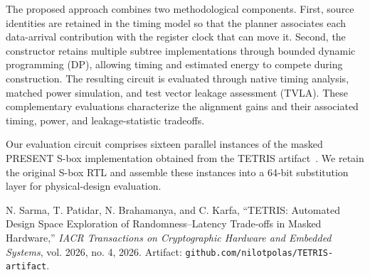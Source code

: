 The proposed approach combines two methodological components.
First, source identities are retained in the timing model so
that the planner associates each data-arrival contribution
with the register clock that can move it. Second, the
constructor retains multiple subtree implementations through
bounded dynamic programming (DP), allowing timing and
estimated energy to compete during construction. The resulting
circuit is evaluated through native timing analysis, matched
power simulation, and test vector leakage assessment (TVLA).
These complementary evaluations characterize the alignment
gains and their associated timing, power, and leakage-statistic
tradeoffs.

Our evaluation circuit comprises sixteen parallel instances
of the masked PRESENT S-box implementation obtained from
the TETRIS artifact~\cite{tetris}. We retain the original
S-box RTL and assemble these instances into a 64-bit
substitution layer for physical-design evaluation.

N. Sarma, T. Patidar, N. Brahamanya, and C. Karfa,
``TETRIS: Automated Design Space Exploration of
Randomness--Latency Trade-offs in Masked Hardware,''
\emph{IACR Transactions on Cryptographic Hardware and
Embedded Systems}, vol. 2026, no. 4, 2026.
Artifact: \texttt{github.com/\allowbreak nilotpolas/\allowbreak TETRIS-artifact}.
